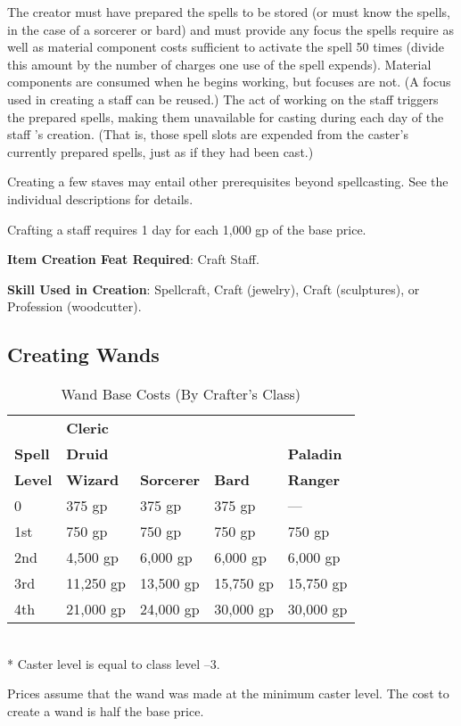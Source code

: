 The creator must have prepared the spells to be stored (or must know the spells, in the case of a sorcerer or bard) and must provide any focus the spells require as well as material component costs sufficient to activate the spell 50 times (divide this amount by the number of charges one use of the spell expends). Material components are consumed when he begins working, but focuses are not. (A focus used in creating a staff can be reused.) The act of working on the staff triggers the prepared spells, making them unavailable for casting during each day of the staff 's creation. (That is, those spell slots are expended from the caster's currently prepared spells, just as if they had been cast.)
				
Creating a few staves may entail other prerequisites beyond spellcasting. See the individual descriptions for details.
				
Crafting a staff requires 1 day for each 1,000 gp of the base price.
				
\textbf{Item Creation Feat Required}: Craft Staff.
				
\textbf{Skill Used in Creation}: Spellcraft, Craft (jewelry), Craft (sculptures), or Profession (woodcutter).
				
\subsection{Creating Wands}

\begin{table}[]
\sffamily
\caption{Wand Base Costs (By Crafter's Class)}
\begin{tabular}{lllll}
               & \textbf{Cleric} & \\
\textbf{Spell} & \textbf{Druid}  &                   &               & \textbf{Paladin} \\
\textbf{Level} & \textbf{Wizard} & \textbf{Sorcerer} & \textbf{Bard} & \textbf{Ranger} \\
0                    & 375 gp                         & 375 gp            & 375 gp        & ---                         \\
1st                  & 750 gp                         & 750 gp            & 750 gp        & 750 gp                    \\
2nd                  & 4,500 gp                       & 6,000 gp          & 6,000 gp      & 6,000 gp                  \\
3rd                  & 11,250 gp                      & 13,500 gp         & 15,750 gp     & 15,750 gp                 \\
4th                  & 21,000 gp                      & 24,000 gp         & 30,000 gp     & 30,000 gp                
\end{tabular}\\
* Caster level is equal to class level --3.
\end{table}
Prices assume that the wand was made at the minimum caster level. The cost to create a wand is half the base price.
				
